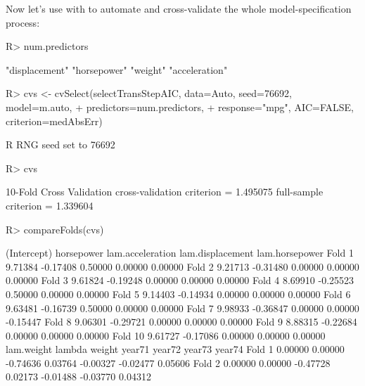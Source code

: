 \documentclass[
]{jss}
\begin{document}
Now let's use  with  to
automate and cross-validate the whole model-specification process:

\begin{CodeChunk}
\begin{CodeInput}
R> num.predictors
\end{CodeInput}
\begin{CodeOutput}
[1] "displacement" "horsepower"   "weight"       "acceleration"
\end{CodeOutput}
\begin{CodeInput}
R> cvs <- cvSelect(selectTransStepAIC, data=Auto, seed=76692, model=m.auto,
+                 predictors=num.predictors,
+                 response="mpg", AIC=FALSE, criterion=medAbsErr)
\end{CodeInput}
\begin{CodeOutput}
R RNG seed set to 76692
\end{CodeOutput}
\begin{CodeInput}
R> cvs
\end{CodeInput}
\begin{CodeOutput}
10-Fold Cross Validation
cross-validation criterion = 1.495075
full-sample criterion = 1.339604 
\end{CodeOutput}
\begin{CodeInput}
R> compareFolds(cvs)
\end{CodeInput}
\begin{CodeOutput}
        (Intercept) horsepower lam.acceleration lam.displacement lam.horsepower
Fold 1      9.71384   -0.17408          0.50000          0.00000        0.00000
Fold 2      9.21713   -0.31480          0.00000          0.00000        0.00000
Fold 3      9.61824   -0.19248          0.00000          0.00000        0.00000
Fold 4      8.69910   -0.25523          0.50000          0.00000        0.00000
Fold 5      9.14403   -0.14934          0.00000          0.00000        0.00000
Fold 6      9.63481   -0.16739          0.50000          0.00000        0.00000
Fold 7      9.98933   -0.36847          0.00000          0.00000       -0.15447
Fold 8      9.06301   -0.29721          0.00000          0.00000        0.00000
Fold 9      8.88315   -0.22684          0.00000          0.00000        0.00000
Fold 10     9.61727   -0.17086          0.00000          0.00000        0.00000
        lam.weight   lambda   weight   year71   year72   year73   year74
Fold 1     0.00000  0.00000 -0.74636  0.03764 -0.00327 -0.02477  0.05606
Fold 2     0.00000  0.00000 -0.47728  0.02173 -0.01488 -0.03770  0.04312

\end{CodeOutput}
\end{CodeChunk}
\end{document}
